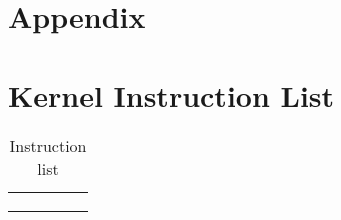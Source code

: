 \section{Appendix}

\appendix
\section{Kernel Instruction List}
\label{sec:KernelInstructionList}

\begin{table}[]
	\centering
	\caption{Instruction list}
	\label{InstructionList}
	\begin{tabular}{lllll}

		&  &  &  &  \\
		&  &  &  &  \\
		&  &  &  & 
	\end{tabular}
\end{table}

